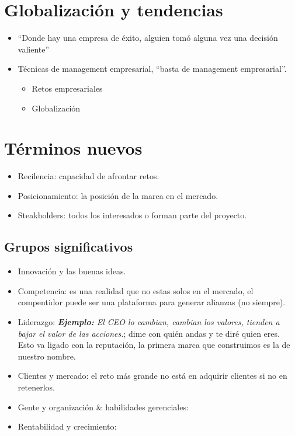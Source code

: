 \section{Globalización y tendencias}
\begin{itemize}
    \item ``Donde hay una empresa de éxito, alguien tomó alguna vez una decisión valiente''
    \item Técnicas de management empresarial, ``basta de management empresarial''. 
        \begin{itemize}
            \item Retos empresariales
            \item Globalización 
        \end{itemize}
        \begin{figure}[htbp]
            \centering
            \caption{}
            \label{}
        \end{figure} 
\end{itemize}

\section{Términos nuevos}
\begin{itemize}
    \item Recilencia: capacidad de afrontar retos.
    \item Posicionamiento: la posición de la marca en el mercado.
    \item Steakholders: todos los interesados o forman parte del proyecto.
\end{itemize}


\subsection{Grupos significativos}
\begin{itemize}
    \item Innovación y las buenas ideas.
    \item Competencia: es una realidad que no estas solos en el mercado, el compentidor puede ser una plataforma para generar alianzas (no siempre).
    \item Liderazgo: \emph{\textbf{Ejemplo: }El CEO lo cambian, cambian los valores, tienden a bajar el valor de las acciones.}; dime con quién andas y te diré quien eres. Esto va ligado con la reputación, la primera marca que construimos es la de nuestro nombre. 
    \item Clientes y mercado: el reto más grande no está en adquirir clientes si no en retenerlos.
    \item Gente y organización \& habilidades gerenciales: 
    \item Rentabilidad y crecimiento: 
\end{itemize}

